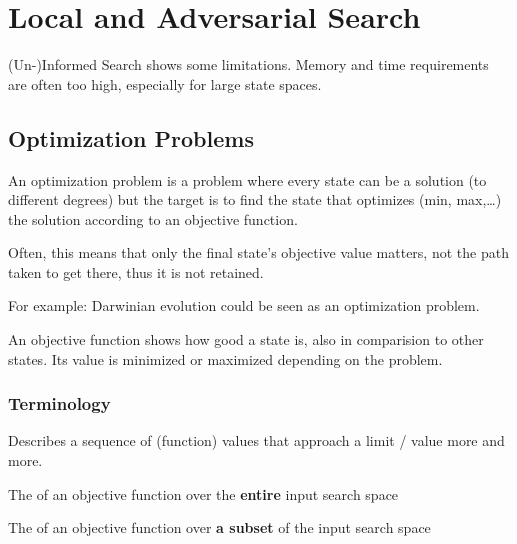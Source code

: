 \documentclass[
../EiKI_Summary.tex,
]
{subfiles}
\begin{document}
\section{Local and Adversarial Search}
(Un-)Informed Search shows some limitations. Memory and time requirements are often too high, especially for large state spaces.

\subsection{Optimization Problems}
\begin{defbox*}
    An optimization problem is a problem where every state can be a solution (to different degrees) but the target is to find the state that optimizes (min, max,\dots) the solution according to an objective function. 

    Often, this means that only the final state's objective value matters, not the path taken to get there, thus it is not retained.

    For example: Darwinian evolution could be seen as an optimization problem.
\end{defbox*}

\begin{defbox}
    An objective function shows how good a state is, also in comparision to other states. Its value is minimized or maximized depending on the problem.
\end{defbox}

\subsubsection{Terminology}
\begin{defbox}
    [Convergence]
    Describes a sequence of (function) values that approach a limit / value more and more.
\end{defbox}

\begin{minipage}
    [t]{0.5\textwidth}
    \begin{defbox}
        The  of an objective function over the \textbf{entire} input search space
    \end{defbox}
\end{minipage}
\begin{minipage}
    [t]{0.5\textwidth}
    \begin{defbox}
        The  of an objective function over \textbf{a subset} of the input search space
    \end{defbox}
\end{minipage}
\end{document}
